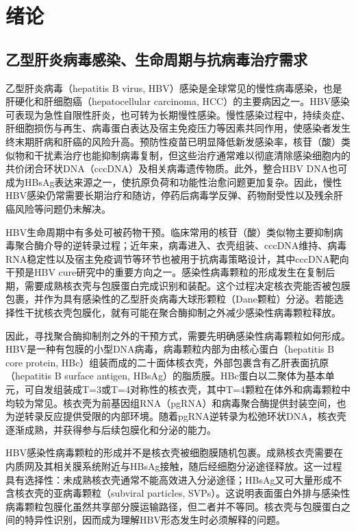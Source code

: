 \chapter{绪论}

\section{乙型肝炎病毒感染、生命周期与抗病毒治疗需求}

乙型肝炎病毒（hepatitis B virus, HBV）感染是全球常见的慢性病毒感染，也是肝硬化和肝细胞癌（hepatocellular carcinoma, HCC）的主要病因之一\cite{hsu2023global,yuen2018hepatitis,dusheiko2023new,lin2020association}。HBV感染可表现为急性自限性肝炎，也可转为长期慢性感染。慢性感染过程中，持续炎症、肝细胞损伤与再生、病毒蛋白表达及宿主免疫压力等因素共同作用，使感染者发生终末期肝病和肝癌的风险升高\cite{iannacone2022immunobiology}。预防性疫苗已明显降低新发感染率，核苷（酸）类似物和干扰素治疗也能抑制病毒复制，但这些治疗通常难以彻底清除感染细胞内的共价闭合环状DNA（cccDNA）及相关病毒遗传物质\cite{fanning2019therapeutic,nassal2015hbv}。此外，整合HBV DNA也可成为HBsAg表达来源之一，使抗原负荷和功能性治愈问题更加复杂\cite{wooddell2017rnai}。因此，慢性HBV感染仍常需要长期治疗和随访，停药后病毒学反弹、药物耐受性以及残余肝癌风险等问题仍未解决。

HBV生命周期中有多处可被药物干预。临床常用的核苷（酸）类似物主要抑制病毒聚合酶介导的逆转录过程；近年来，病毒进入、衣壳组装、cccDNA维持、病毒RNA稳定性以及宿主免疫调节等环节也被用于抗病毒策略设计，其中cccDNA靶向干预是HBV cure研究中的重要方向之一\cite{revill2019global,lucifora2014specific,selzer2015assembly,taverniti2022capsid,chuang2024entry}。感染性病毒颗粒的形成发生在复制后期，需要成熟核衣壳与包膜蛋白完成识别和装配。这个过程决定核衣壳能否被包膜包裹，并作为具有感染性的乙型肝炎病毒大球形颗粒（Dane颗粒）分泌。若能选择性干扰核衣壳包膜化，就有可能在聚合酶抑制之外减少感染性病毒颗粒释放。

因此，寻找聚合酶抑制剂之外的干预方式，需要先明确感染性病毒颗粒如何形成。HBV是一种有包膜的小型DNA病毒，病毒颗粒内部为由核心蛋白（hepatitis B core protein, HBc）组装而成的二十面体核衣壳，外部包裹含有乙肝表面抗原（hepatitis B surface antigen, HBsAg）的脂质膜\cite{venkatakrishnan2016structural}。HBc蛋白以二聚体为基本单元，可自发组装成T=3或T=4对称性的核衣壳，其中T=4颗粒在体外和病毒颗粒中均较为常见。核衣壳为前基因组RNA（pgRNA）和病毒聚合酶提供封装空间，也为逆转录反应提供受限的内部环境。随着pgRNA逆转录为松弛环状DNA，核衣壳逐渐成熟，并获得参与后续包膜化和分泌的能力。

HBV感染性病毒颗粒的形成并不是核衣壳被细胞膜随机包裹。成熟核衣壳需要在内质网及其相关膜系统附近与HBsAg接触，随后经细胞分泌途径释放\cite{bruss2007morphogenesis,selzer2015assembly}。这一过程具有选择性：未成熟核衣壳通常不能高效进入分泌途径；HBsAg又可大量形成不含核衣壳的亚病毒颗粒（subviral particles, SVPs）。这说明表面蛋白外排与感染性病毒颗粒包膜化虽然共享部分膜运输路径，但二者并不等同。核衣壳与包膜蛋白之间的特异性识别，因而成为理解HBV形态发生时必须解释的问题。

